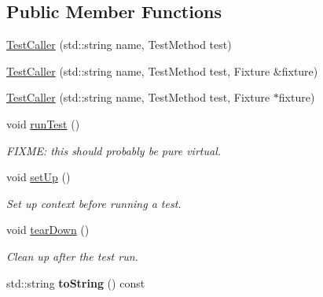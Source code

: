 \subsection*{Public Member Functions}
\begin{DoxyCompactItemize}
\item 
\hyperlink{class_test_caller_a84cb35144455c4245c45d755b84c6093}{Test\+Caller} (std\+::string name, Test\+Method test)
\item 
\hyperlink{class_test_caller_a21479de59b7c38a6d8bed9e66025ebb0}{Test\+Caller} (std\+::string name, Test\+Method test, Fixture \&fixture)
\item 
\hyperlink{class_test_caller_a5977f4de9736929451f30b039a42487d}{Test\+Caller} (std\+::string name, Test\+Method test, Fixture $\ast$fixture)
\item 
void \hyperlink{class_test_caller_aad0c877a47b75d056a4f8f323d3169ab}{run\+Test} ()\hypertarget{class_test_caller_aad0c877a47b75d056a4f8f323d3169ab}{}\label{class_test_caller_aad0c877a47b75d056a4f8f323d3169ab}

\begin{DoxyCompactList}\small\item\em F\+I\+X\+ME\+: this should probably be pure virtual. \end{DoxyCompactList}\item 
void \hyperlink{class_test_caller_ae6880afc711d24ae0b8846759064ceea}{set\+Up} ()\hypertarget{class_test_caller_ae6880afc711d24ae0b8846759064ceea}{}\label{class_test_caller_ae6880afc711d24ae0b8846759064ceea}

\begin{DoxyCompactList}\small\item\em Set up context before running a test. \end{DoxyCompactList}\item 
void \hyperlink{class_test_caller_a0e463b88bf0ceacbd8875e0450ed2649}{tear\+Down} ()\hypertarget{class_test_caller_a0e463b88bf0ceacbd8875e0450ed2649}{}\label{class_test_caller_a0e463b88bf0ceacbd8875e0450ed2649}

\begin{DoxyCompactList}\small\item\em Clean up after the test run. \end{DoxyCompactList}\item 
std\+::string {\bfseries to\+String} () const \hypertarget{class_test_caller_a55f4f93fc657acb8c1dd500923a4bd1f}{}\label{class_test_caller_a55f4f93fc657acb8c1dd500923a4bd1f}

\end{DoxyCompactItemize}
